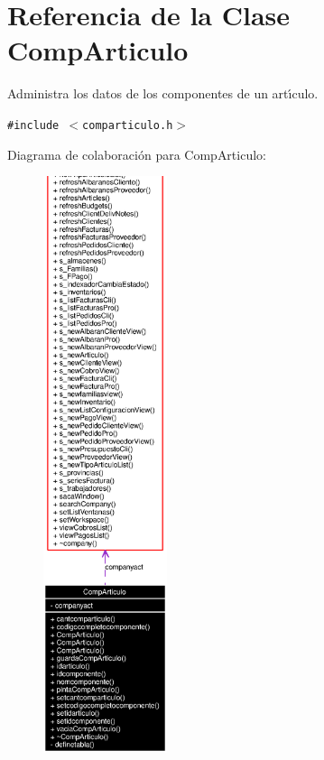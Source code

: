 \section{Referencia de la Clase Comp\-Articulo}
\label{classCompArticulo}
Administra los datos de los componentes de un art\'{\i}culo.  


{\tt \#include $<$comparticulo.h$>$}

Diagrama de colaboraci\'{o}n para Comp\-Articulo:\begin{figure}[H]
\begin{center}
\leavevmode
\includegraphics[width=103pt]{classCompArticulo__coll__graph}
\end{center}
\end{figure}
